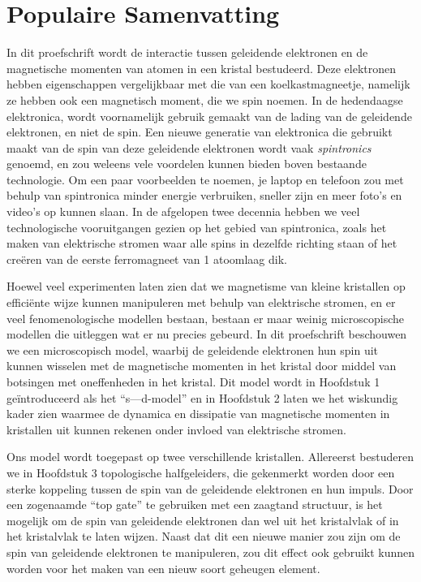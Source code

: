 \manualmark
{}%
%
%
\chapter*{Populaire Samenvatting}%
In dit proefschrift wordt de interactie tussen geleidende elektronen en de magnetische momenten van atomen in een kristal bestudeerd. Deze elektronen hebben eigenschappen vergelijkbaar met die van een koelkastmagneetje, namelijk ze hebben ook een magnetisch moment, die we spin noemen. In de hedendaagse elektronica, wordt voornamelijk gebruik gemaakt van de lading van de geleidende elektronen, en niet de spin. Een nieuwe generatie van elektronica die gebruikt maakt van de spin van deze geleidende elektronen wordt vaak \emph{spintronics} genoemd, en zou weleens vele voordelen kunnen bieden boven bestaande technologie. Om een paar voorbeelden te noemen, je laptop en telefoon zou met behulp van spintronica minder energie verbruiken, sneller zijn en meer foto's en video's op kunnen slaan. In de afgelopen twee decennia hebben we veel technologische vooruitgangen gezien op het gebied van spintronica, zoals het maken van elektrische stromen waar alle spins in dezelfde richting staan of het creëren van de eerste ferromagneet van 1 atoomlaag dik. 

Hoewel veel experimenten laten zien dat we magnetisme van kleine kristallen op efficiënte wijze kunnen manipuleren met behulp van elektrische stromen, en er veel fenomenologische modellen bestaan, bestaan er maar weinig microscopische modellen die uitleggen wat er nu precies gebeurd. In dit proefschrift beschouwen we een microscopisch model, waarbij de geleidende elektronen hun spin uit kunnen wisselen met de magnetische momenten in het kristal door middel van botsingen met oneffenheden in het kristal. Dit model wordt in Hoofdstuk 1 geïntroduceerd als het “s—d-model” en in Hoofdstuk 2 laten we het wiskundig kader zien waarmee de dynamica en dissipatie van magnetische momenten in kristallen uit kunnen rekenen onder invloed van elektrische stromen. 

Ons model wordt toegepast op twee verschillende kristallen. Allereerst bestuderen we in Hoofdstuk 3 topologische halfgeleiders, die gekenmerkt worden door een sterke koppeling tussen de spin van de geleidende elektronen en hun impuls. Door een zogenaamde “top gate” te gebruiken met een zaagtand structuur, is het mogelijk om de spin van geleidende elektronen dan wel uit het kristalvlak of in het kristalvlak te laten wijzen. Naast dat dit een nieuwe manier zou zijn om de spin van geleidende elektronen te manipuleren, zou dit effect ook gebruikt kunnen worden voor het maken van een nieuw soort geheugen element. 

